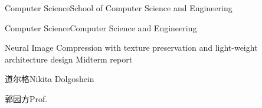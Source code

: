 
\school
{Computer Science}{School of Computer Science and Engineering}

\major
{Computer Science}{Computer Science and Engineering}

\thesistitle
{}
{}
{Neural Image Compression with texture preservation and light-weight architecture design}
{Midterm report}

\thesisauthor
{道尔格}{Nikita Dolgoshein}

\teacher
{郭园方}{Prof.}






